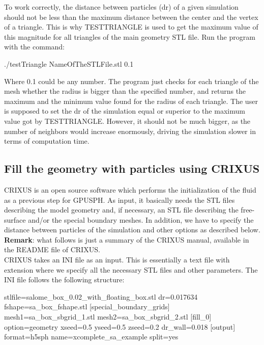 To work correctly, the distance between particles (dr) of a given simulation 
should not be less than the maximum distance between the center and the 
vertex of a triangle. This is why TESTTRIANGLE is used to get the maximum 
value of this magnitude for all triangles of the main geometry STL file. 
Run the program with the command:
\begin{shellcode}
./testTriangle NameOfTheSTLFile.stl 0.1
\end{shellcode}
Where 0.1 could be any number. 
The program just checks for each triangle of the mesh whether the 
radius is bigger than the specified number, and returns the 
maximum and the minimum value found for the radius of each triangle. 
The user is supposed to set the dr of the simulation equal 
or superior to the maximum value got by TESTTRIANGLE. 
However, it should not be much bigger, as the number of neighbors 
would increase enormously, driving the simulation slower in terms of computation time.

\subsection{Fill the geometry with particles using CRIXUS}

CRIXUS is an open source software which performs the initialization 
of the fluid as a previous step for GPUSPH. 
As input, it basically needs the STL files describing the model geometry 
and, if necessary, an STL file describing the free-surface and/or the special 
boundary meshes. 
In addition, we have to specify the distance between particles 
of the simulation and other options as described below.\\

\textbf{Remark}: what follows is just a summary of the CRIXUS manual, 
available in the README file of CRIXUS.\\

CRIXUS takes an INI file as an input. 
This is essentially a text file with  extension 
where we specify all the necessary STL files and other parameters.
The INI file follows the following structure:
\begin{ccode}
[mesh]
  stlfile=salome_box_0.02_with_floating_box.stl
  dr=0.017634
  fshape=sa_box_fshape.stl
[special_boundary_grids]
  mesh1=sa_box_sbgrid_1.stl
  mesh2=sa_box_sbgrid_2.stl
[fill_0]
  option=geometry
  xseed=0.5
  yseed=0.5
  zseed=0.2
  dr_wall=0.018
[output]
  format=h5sph
  name=xcomplete_sa_example
  split=yes
\end{ccode}

